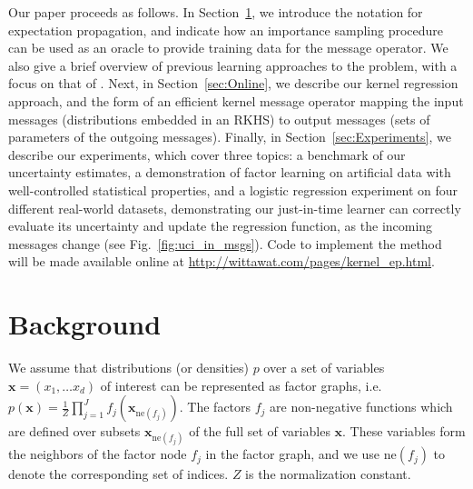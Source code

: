 \documentclass[english]{article}
\theoremstyle{plain}
\theoremstyle{plain}
\newcommand{\bx}{\mathbf{x}}				%
\newcommand{\factor}{f}				%
\newcommand{\fis}[1]{\mathrm{ne}(#1)}   	%
\newcommand{\fx}[1]{ \mathbf{x}_{\mathrm{ne}(#1)} }   	%
\newcommand{\figref}[1]{Fig.~\ref{#1}}
\newcommand{\secref}[1]{Section~\ref{#1}}
\begin{document}

Our paper proceeds as follows. In \secref{sec:EP}, we introduce the notation for expectation propagation,
and indicate how an importance sampling procedure can be used as an oracle to provide training data for the message operator.
We also give a brief overview of previous learning approaches to the problem, with a focus on
that of \citet{Eslami2014}.
Next, in \secref{sec:Online}, we describe our kernel regression approach, and
the form of an efficient kernel message operator mapping the input messages (distributions embedded in an
RKHS) to output messages (sets of parameters of the outgoing messages).
Finally, in \secref{sec:Experiments}, we describe our experiments, which cover three topics:
a benchmark of our uncertainty estimates, a demonstration of factor learning
on artificial data with well-controlled statistical properties,
and a logistic regression experiment on four different real-world datasets,
demonstrating our just-in-time learner can correctly evaluate its uncertainty
and update the regression function, as the incoming messages change (see \figref{fig:uci_in_msgs}).
Code to implement the method will be made available online at \url{http://wittawat.com/pages/kernel_ep.html}.




\section{Background}
\label{sec:EP}

We assume that distributions (or densities) $p$ over a set of variables 
$\bx = (x_1, \dots x_d)$ of interest can be represented as factor graphs, i.e.\
%
$p(\bx) = \frac{1}{Z} \prod_{j=1}^J \factor_j(\fx{\factor_j})$.
The factors $\factor_j$ are non-negative functions which are defined over subsets $\fx{\factor_j}$ of the full set of variables $\bx$. These variables form the neighbors of the factor node $\factor_j$ in the factor graph, and we use $\fis{\factor_j}$ to denote the corresponding set of indices. $Z$ is the normalization constant.
\end{document}
